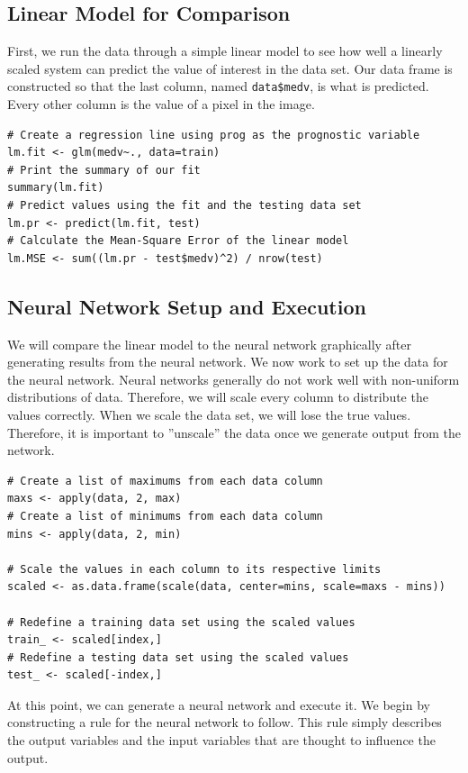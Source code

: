 \subsection{Linear Model for Comparison}

First, we run the data through a simple linear model to see how well a linearly scaled system can predict the value of interest in the data set.
Our data frame is constructed so that the last column, named \verb|data$medv|, is what is predicted. Every other column is the value of a pixel in the image.

\begin{lstlisting}
# Create a regression line using prog as the prognostic variable
lm.fit <- glm(medv~., data=train)
# Print the summary of our fit
summary(lm.fit)
# Predict values using the fit and the testing data set
lm.pr <- predict(lm.fit, test)
# Calculate the Mean-Square Error of the linear model
lm.MSE <- sum((lm.pr - test$medv)^2) / nrow(test)
\end{lstlisting}

\subsection{Neural Network Setup and Execution}

We will compare the linear model to the neural network graphically after generating results from the neural network.
We now work to set up the data for the neural network.
Neural networks generally do not work well with non-uniform distributions of data.
Therefore, we will scale every column to distribute the values correctly.
When we scale the data set, we will lose the true values.
Therefore, it is important to ''unscale'' the data once we generate output from the network.

\begin{lstlisting}
# Create a list of maximums from each data column
maxs <- apply(data, 2, max)
# Create a list of minimums from each data column
mins <- apply(data, 2, min)

# Scale the values in each column to its respective limits
scaled <- as.data.frame(scale(data, center=mins, scale=maxs - mins))

# Redefine a training data set using the scaled values
train_ <- scaled[index,]
# Redefine a testing data set using the scaled values
test_ <- scaled[-index,]
\end{lstlisting}

At this point, we can generate a neural network and execute it.
We begin by constructing a rule for the neural network to follow.
This rule simply describes the output variables and the input variables that are thought to influence the output. 

